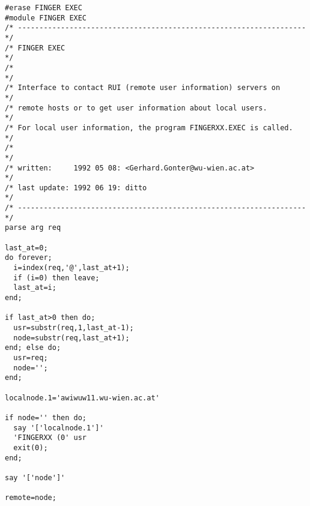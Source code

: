 \begin{verbatim}
#erase FINGER EXEC
#module FINGER EXEC
/* ------------------------------------------------------------------- */
/* FINGER EXEC                                                         */
/*                                                                     */
/* Interface to contact RUI (remote user information) servers on       */
/* remote hosts or to get user information about local users.          */
/* For local user information, the program FINGERXX.EXEC is called.    */
/*                                                                     */
/* written:     1992 05 08: <Gerhard.Gonter@wu-wien.ac.at>             */
/* last update: 1992 06 19: ditto                                      */
/* ------------------------------------------------------------------- */
parse arg req

last_at=0;
do forever;
  i=index(req,'@',last_at+1);
  if (i=0) then leave;
  last_at=i;
end;

if last_at>0 then do;
  usr=substr(req,1,last_at-1);
  node=substr(req,last_at+1);
end; else do;
  usr=req;
  node='';
end;

localnode.1='awiwuw11.wu-wien.ac.at'

if node='' then do;
  say '['localnode.1']'
  'FINGERXX (0' usr
  exit(0);
end;

say '['node']'

remote=node;


\end{verbatim}
